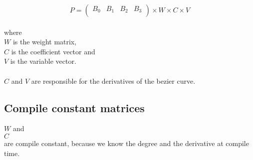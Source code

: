 \begin{equation*}
    P=
    \left(
    \begin{array}{cccc}
        B_0 & B_1 & B_2 & B_3 \\
    \end{array}
    \right)
    \times
    W
    \times
    C
    \times
    V
\end{equation*}
\\
where
\\
$W$ is the weight matrix,\\
$C$ is the coefficient vector and\\
$V$ is the variable vector.\\
\\
$C$ and $V$ are responsible for the derivatives of the bezier curve.

\subsection{Compile constant matrices}

$W$ and\\
$C$ \\
are compile constant, because we know the degree and the derivative at compile time.